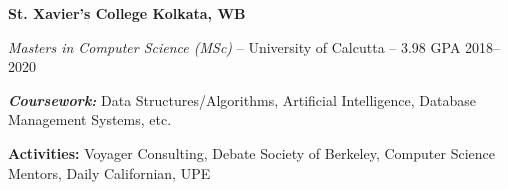 \textbf{St. Xavier's College \hfill Kolkata, WB} \par
\textit{Masters in Computer Science (MSc)} -- University of Calcutta -- 3.98 GPA \hfill 2018--2020\par
\textbf{\textit{Coursework:}} Data Structures/Algorithms, Artificial Intelligence, Database Management Systems, etc.\par
\textbf{\textit{}{Activities:}} Voyager Consulting, Debate Society of Berkeley, Computer Science Mentors, Daily Californian, UPE
